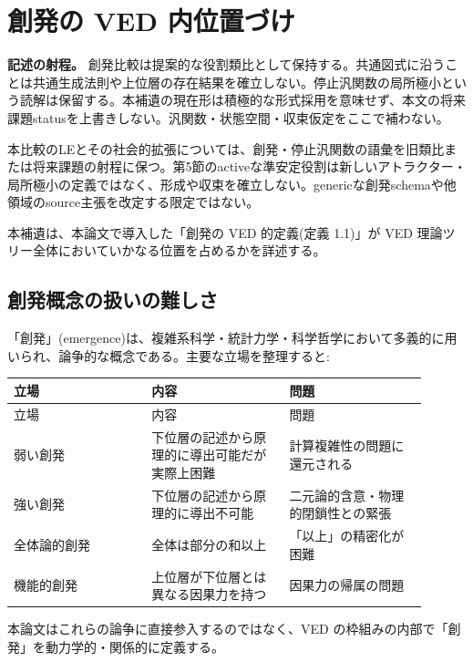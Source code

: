 \section{創発の VED 内位置づけ}

\noindent\textbf{記述の射程。} 創発比較は提案的な役割類比として保持する。共通図式に沿うことは共通生成法則や上位層の存在結果を確立しない。停止汎関数の局所極小という読解は保留する。本補遺の現在形は積極的な形式採用を意味せず、本文の将来課題statusを上書きしない。汎関数・状態空間・収束仮定をここで補わない。

本比較のLEとその社会的拡張については、創発・停止汎関数の語彙を旧類比または将来課題の射程に保つ。第5節のactiveな準安定役割は新しいアトラクター・局所極小の定義ではなく、形成や収束を確立しない。genericな創発schemaや他領域のsource主張を改定する限定ではない。



本補遺は、本論文で導入した「創発の VED 的定義(定義 1.1)」が VED 理論ツリー全体においていかなる位置を占めるかを詳述する。

\bigskip


\subsection{創発概念の扱いの難しさ}


「創発」(emergence)は、複雑系科学・統計力学・科学哲学において多義的に用いられ、論争的な概念である。主要な立場を整理すると:

\begin{longtable}{@{}p{0.30\linewidth}p{0.30\linewidth}p{0.30\linewidth}@{}}
\toprule
立場 & 内容 & 問題 \\
\midrule
\endfirsthead
\toprule
立場 & 内容 & 問題 \\
\midrule
\endhead
弱い創発 & 下位層の記述から原理的に導出可能だが実際上困難 & 計算複雑性の問題に還元される \\
強い創発 & 下位層の記述から原理的に導出不可能 & 二元論的含意・物理的閉鎖性との緊張 \\
全体論的創発 & 全体は部分の和以上 & 「以上」の精密化が困難 \\
機能的創発 & 上位層が下位層とは異なる因果力を持つ & 因果力の帰属の問題 \\
\bottomrule
\end{longtable}


本論文はこれらの論争に直接参入するのではなく、VED の枠組みの内部で「創発」を動力学的・関係的に定義する。

